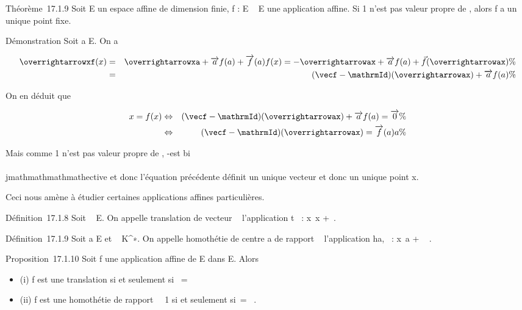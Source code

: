 Théorème~17.1.9 Soit E un espace affine de dimension finie, f : E \rightarrow~ E
une application affine. Si 1 n'est pas valeur propre de
\vecf, alors f a un unique point fixe.

Démonstration Soit a \in E. On a

\begin{align*}
\overrightarrowxf(x)& =&
\overrightarrowxa +\overrightarrow
af(a) +\overrightarrow f(a)f(x) =
-\overrightarrowax +\overrightarrow
af(a) +\vec
f(\overrightarrowax)\%&
\\ & =& (\vecf
-\mathrmId)(\overrightarrowax)
+\overrightarrow af(a) \%&
\\ \end{align*}

On en déduit que

\begin{align*} x = f(x)&
\Leftrightarrow & (\vecf
-\mathrmId)(\overrightarrowax)
+\overrightarrow af(a)
=\overrightarrow 0\%&
\\ & \Leftrightarrow &
(\vecf
-\mathrmId)(\overrightarrowax)
=\overrightarrow f(a)a \%&
\\ \end{align*}

Mais comme 1 n'est pas valeur propre de \vecf,
\vecf -\mathrmId est bi\\\\jmathmathmathmathective et
donc l'équation précédente définit un unique vecteur
\overrightarrowax et donc un unique point x.

Ceci nous amène à étudier certaines applications affines particulières.

Définition~17.1.8 Soit \overrightarrow\xi~
\in\overrightarrow E. On appelle translation de vecteur
\overrightarrow\xi~ l'application
t\overrightarrow\xi~ :
x\mapsto~x +\overrightarrow \xi~.

Définition~17.1.9 Soit a \in E et \lambda~ \in K^∗. On appelle
homothétie de centre a de rapport \lambda~ l'application ha,\lambda~ :
x\mapsto~a + \lambda~ \overrightarrowax.

Proposition~17.1.10 Soit f une application affine de E dans E. Alors

\begin{itemize}
\itemsep1pt\parskip0pt
\item
  (i) f est une translation si et seulement si~\vecf
  = \mathrmId
\item
  (ii) f est une homothétie de rapport \lambda~\neq~1 si
  et seulement si~\vecf =
  \lambda~\mathrmId.
\end{itemize}

